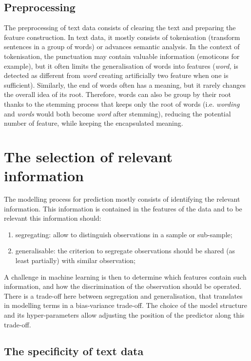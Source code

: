 \documentclass[a4paper, justified]{tufte-handout}
\begin{document}
\begin{fullwidth}
\subsection{Preprocessing}

The preprocessing of text data consists of clearing the text and preparing the feature construction. In text data, it mostly consists of tokenisation (transform sentences in a group of words) or advances semantic analysis. In the context of tokenisation, the punctuation may contain valuable information (emoticons for example), but it often limits the generalisation of words into features (\textit{word,} is detected as different from \textit{word} creating artificially two feature when one is sufficient). Similarly, the end of words often has a meaning, but it rarely changes the overall idea of its root. Therefore, words can also be group by their root thanks to the stemming process that keeps only the root of words (i.e. \textit{wording} and \textit{words} would both become \textit{word} after stemming), reducing the potential number of feature, while keeping the encapsulated meaning.


\section{The selection of relevant information}

The modelling process for prediction mostly consists of identifying the relevant information. This information is contained in the features of the data and to be relevant this information should:
\begin{enumerate}
\item segregating: allow to distinguish observations in a sample or sub-sample;
\item generalisable: the criterion to segregate observations should be shared (as least partially) with similar observation;
\end{enumerate}
A challenge in machine learning is then to determine which features contain such information, and how the discrimination of the observation should be operated. There is a trade-off here between segregation and generalisation, that translates in modelling terms in a bias-variance trade-off. The choice of the model structure and its hyper-parameters allow adjusting the position of the predictor along this trade-off.

\subsection{The specificity of text data}


\end{fullwidth}
\end{document}
